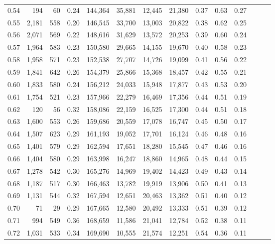 \begin{tabular}{rrrrrrrrrrrrrr}
0.54 &    194 &     60 &  0.24 &  144,364 &   35,881 &  12,445 &  21,380 &  0.37 &  0.63 &      0.27 \\
0.55 &  2,181 &    558 &  0.20 &  146,545 &   33,700 &  13,003 &  20,822 &  0.38 &  0.62 &      0.25 \\
0.56 &  2,071 &    569 &  0.22 &  148,616 &   31,629 &  13,572 &  20,253 &  0.39 &  0.60 &      0.24 \\
0.57 &  1,964 &    583 &  0.23 &  150,580 &   29,665 &  14,155 &  19,670 &  0.40 &  0.58 &      0.23 \\
0.58 &  1,958 &    571 &  0.23 &  152,538 &   27,707 &  14,726 &  19,099 &  0.41 &  0.56 &      0.22 \\
0.59 &  1,841 &    642 &  0.26 &  154,379 &   25,866 &  15,368 &  18,457 &  0.42 &  0.55 &      0.21 \\
0.60 &  1,833 &    580 &  0.24 &  156,212 &   24,033 &  15,948 &  17,877 &  0.43 &  0.53 &      0.20 \\
0.61 &  1,754 &    521 &  0.23 &  157,966 &   22,279 &  16,469 &  17,356 &  0.44 &  0.51 &      0.19 \\
0.62 &    120 &     56 &  0.32 &  158,086 &   22,159 &  16,525 &  17,300 &  0.44 &  0.51 &      0.18 \\
0.63 &  1,600 &    553 &  0.26 &  159,686 &   20,559 &  17,078 &  16,747 &  0.45 &  0.50 &      0.17 \\
0.64 &  1,507 &    623 &  0.29 &  161,193 &   19,052 &  17,701 &  16,124 &  0.46 &  0.48 &      0.16 \\
0.65 &  1,401 &    579 &  0.29 &  162,594 &   17,651 &  18,280 &  15,545 &  0.47 &  0.46 &      0.16 \\
0.66 &  1,404 &    580 &  0.29 &  163,998 &   16,247 &  18,860 &  14,965 &  0.48 &  0.44 &      0.15 \\
0.67 &  1,278 &    542 &  0.30 &  165,276 &   14,969 &  19,402 &  14,423 &  0.49 &  0.43 &      0.14 \\
0.68 &  1,187 &    517 &  0.30 &  166,463 &   13,782 &  19,919 &  13,906 &  0.50 &  0.41 &      0.13 \\
0.69 &  1,131 &    544 &  0.32 &  167,594 &   12,651 &  20,463 &  13,362 &  0.51 &  0.40 &      0.12 \\
0.70 &     71 &     29 &  0.29 &  167,665 &   12,580 &  20,492 &  13,333 &  0.51 &  0.39 &      0.12 \\
0.71 &    994 &    549 &  0.36 &  168,659 &   11,586 &  21,041 &  12,784 &  0.52 &  0.38 &      0.11 \\
0.72 &  1,031 &    533 &  0.34 &  169,690 &   10,555 &  21,574 &  12,251 &  0.54 &  0.36 &      0.11 \\

\end{tabular}
